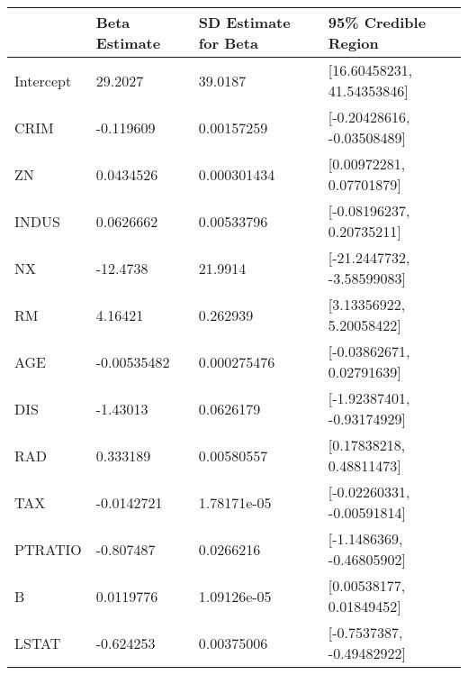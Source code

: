 \begin{tabular}{llll}
\hline
           & Beta Estimate   & SD Estimate for Beta   & 95\% Credible Region        \\
\hline
 Intercept & 29.2027         & 39.0187                & [16.60458231, 41.54353846] \\
 CRIM      & -0.119609       & 0.00157259             & [-0.20428616, -0.03508489] \\
 ZN        & 0.0434526       & 0.000301434            & [0.00972281, 0.07701879]   \\
 INDUS     & 0.0626662       & 0.00533796             & [-0.08196237, 0.20735211]  \\
 NX        & -12.4738        & 21.9914                & [-21.2447732, -3.58599083] \\
 RM        & 4.16421         & 0.262939               & [3.13356922, 5.20058422]   \\
 AGE       & -0.00535482     & 0.000275476            & [-0.03862671, 0.02791639]  \\
 DIS       & -1.43013        & 0.0626179              & [-1.92387401, -0.93174929] \\
 RAD       & 0.333189        & 0.00580557             & [0.17838218, 0.48811473]   \\
 TAX       & -0.0142721      & 1.78171e-05            & [-0.02260331, -0.00591814] \\
 PTRATIO   & -0.807487       & 0.0266216              & [-1.1486369, -0.46805902]  \\
 B         & 0.0119776       & 1.09126e-05            & [0.00538177, 0.01849452]   \\
 LSTAT     & -0.624253       & 0.00375006             & [-0.7537387, -0.49482922]  \\
\hline
\end{tabular}